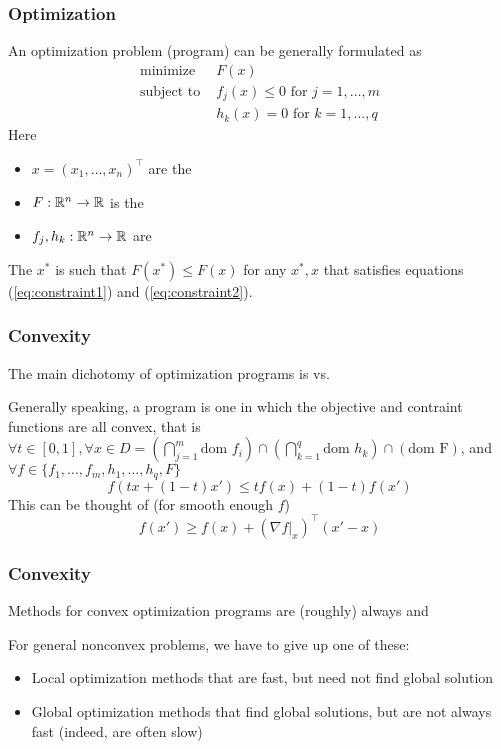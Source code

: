 \documentclass{beamer}
\begin{document}

\begin{frame}[fragile]
\frametitle{Optimization}
An optimization problem (program) can be generally formulated as
\begin{align}
\textrm{minimize } & F(x) \\
\label{eq:constraint1}
\textrm{subject to } 
& f_j(x) \leq 0 \textrm{ for }  j = 1, \ldots, m \\
\label{eq:constraint2}
& h_k(x) = 0 \textrm{ for }  k = 1, \ldots, q
\end{align}
Here
\begin{itemize}
\item[] $x = (x_1, \ldots, x_n)^{\top}$ are the 
\item[] $F:\mathbb{R}^n \rightarrow \mathbb{R}$ is the 
\item[] $f_j,h_k:\mathbb{R}^n \rightarrow \mathbb{R}$ are 
\end{itemize}

\vsp
The  $x^*$ is such that $F(x^*) \leq F(x)$ for any $x^*,x$ that satisfies equations (\ref{eq:constraint1}) and (\ref{eq:constraint2}).
\end{frame}

\begin{frame}[fragile]
\frametitle{Convexity}
The main dichotomy of optimization programs is   vs. 
\vsp

Generally speaking, a  program is one in which the objective and contraint functions are all convex,
that is $\forall t \in [0,1], \forall x \in D = \left(\bigcap_{j =1}^m \textrm{dom } f_i \right) 
\cap \left(\bigcap_{k=1}^q \textrm{dom } h_k\right) \cap \left(\textrm{dom F}\right)$, and 
$\forall f \in \{ f_1,\ldots, f_m, h_1,\ldots,h_q, F\}$
\[
f(tx + (1-t)x') \leq tf(x) + (1-t)f(x')
\]
This can be thought of (for smooth enough $f$)
\[
f(x') \geq f(x) + (\nabla f|_x)^{\top} (x' - x) 
\]


\end{frame}

\begin{frame}[fragile]
\frametitle{Convexity}
Methods  for convex optimization programs are (roughly) always  and 

\vsp
For general nonconvex problems, we have to give up one of these:
\begin{itemize}
\item Local optimization methods that are fast, but need not find global solution
\item Global optimization methods that find global solutions, but
are not always fast (indeed, are often slow)
\end{itemize}
\end{frame}
\end{document}
